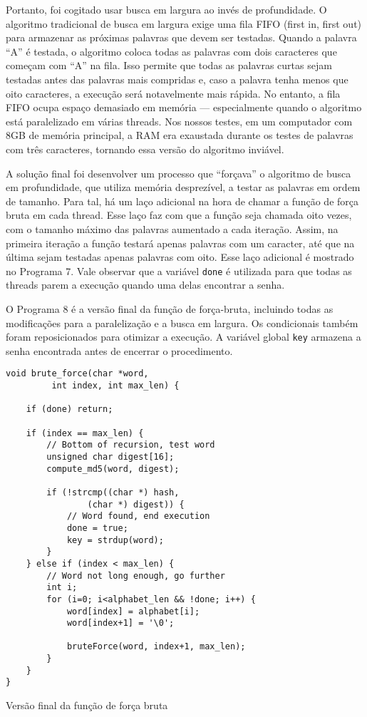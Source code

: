 \documentclass{sig-alternate-05-2015}
\begin{document}
Portanto, foi cogitado usar busca em largura ao invés de profundidade.
O algoritmo tradicional de busca em largura exige uma fila FIFO (first in, first out) para armazenar as próximas palavras que devem ser testadas.
Quando a palavra ``A'' é testada, o algoritmo coloca todas as palavras com dois caracteres que começam com ``A'' na fila.
Isso permite que todas as palavras curtas sejam testadas antes das palavras mais compridas e, caso a palavra tenha menos que oito caracteres, a execução será notavelmente mais rápida.
No entanto, a fila FIFO ocupa espaço demasiado em memória — especialmente quando o algoritmo está paralelizado em várias threads.
Nos nossos testes, em um computador com 8GB de memória principal, a RAM era exaustada durante os testes de palavras com três caracteres, tornando essa versão do algoritmo inviável.

A solução final foi desenvolver um processo que ``forçava'' o algoritmo de busca em profundidade, que utiliza memória desprezível, a testar as palavras em ordem de tamanho.
Para tal, há um laço adicional na hora de chamar a função de força bruta em cada thread.
Esse laço faz com que a função seja chamada oito vezes, com o tamanho máximo das palavras aumentado a cada iteração.
Assim, na primeira iteração a função testará apenas palavras com um caracter, até que na última sejam testadas apenas palavras com oito.
Esse laço adicional é mostrado no Programa 7.
Vale observar que a variável \texttt{done} é utilizada para que todas as threads parem a execução quando uma delas encontrar a senha.

O Programa 8 é a versão final da função de força-bruta, incluindo todas as modificações para a paralelização e a busca em largura.
Os condicionais também foram reposicionados para otimizar a execução.
A variável global \texttt{key} armazena a senha encontrada antes de encerrar o procedimento.

\begin{program}
\begin{lstlisting}
void brute_force(char *word,
         int index, int max_len) {

    if (done) return;
    
    if (index == max_len) {
    	// Bottom of recursion, test word
        unsigned char digest[16];
        compute_md5(word, digest);

        if (!strcmp((char *) hash, 
        		(char *) digest)) {
        	// Word found, end execution
            done = true;
            key = strdup(word);
        }
    } else if (index < max_len) {
    	// Word not long enough, go further
        int i;
        for (i=0; i<alphabet_len && !done; i++) {
            word[index] = alphabet[i];
            word[index+1] = '\0';

            bruteForce(word, index+1, max_len);
        }
    }
}
\end{lstlisting}
\caption{Versão final da função de força bruta}
\end{program}
\end{document}
